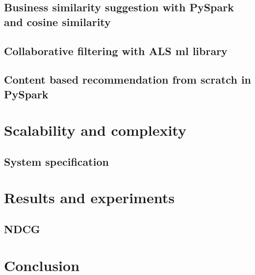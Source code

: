 \documentclass[12pt,english]{report}
\begin{document}
\section{Business similarity suggestion with PySpark and cosine similarity}
\section{Collaborative filtering with ALS ml library}
\section{Content based recommendation from scratch in PySpark}

\chapter{Scalability and complexity}\label{ch:scalability}
\section{System specification}
\chapter{Results and experiments}\label{ch:results}
\section{NDCG}
\chapter{Conclusion}\label{ch:conclusion}


\lstlistoflistings


\end{document}
